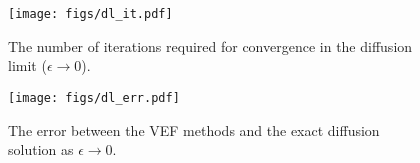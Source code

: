 	\begin{figure}[htb]
		\centering
		\texttt{[image: figs/dl\_it.pdf]}
		\caption{The number of iterations required for convergence in the diffusion limit ($\epsilon \rightarrow 0$). }
		\label{fig:dl_it}
	\end{figure}
	\begin{figure}
		\centering
		\texttt{[image: figs/dl\_err.pdf]}
		\caption{The error between the VEF methods and the exact diffusion solution as $\epsilon \rightarrow 0$. }
		\label{fig:dl_err}
	\end{figure}
	\clearpage